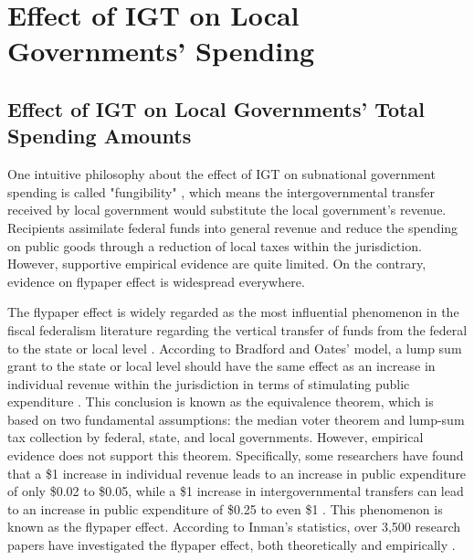 \section{Effect of IGT on Local Governments' Spending}

\subsection{Effect of IGT on Local Governments' Total Spending Amounts}

One intuitive philosophy about the effect of IGT on subnational government spending is called "fungibility" \cite{pack1993foreign}, which means the intergovernmental transfer received by local government would substitute the local government's revenue. Recipients assimilate federal funds into general revenue and reduce the spending on public goods through a reduction of local taxes within the jurisdiction. However, supportive empirical evidence are quite limited. On the contrary, evidence on flypaper effect is widespread everywhere.

The flypaper effect is widely regarded as the most influential phenomenon in the fiscal federalism literature regarding the vertical transfer of funds from the federal to the state or local level \cite{hines1995anomalies,gamkhar2007impact}. According to Bradford and Oates' model, a lump sum grant to the state or local level should have the same effect as an increase in individual revenue within the jurisdiction in terms of stimulating public expenditure \cite{bradford1971analysis}. This conclusion is known as the equivalence theorem, which is based on two fundamental assumptions: the median voter theorem and lump-sum tax collection by federal, state, and local governments. However, empirical evidence does not support this theorem. Specifically, some researchers have found that a \$1 increase in individual revenue leads to an increase in public expenditure of only \$0.02 to \$0.05, while a \$1 increase in intergovernmental transfers can lead to an increase in public expenditure of \$0.25 to even \$1 \cite{bailey1998flypaper,dollery1996empirical,gamkhar2007impact}. This phenomenon is known as the flypaper effect. According to Inman's statistics, over 3,500 research papers have investigated the flypaper effect, both theoretically and empirically \cite{inman2008flypaper}.


